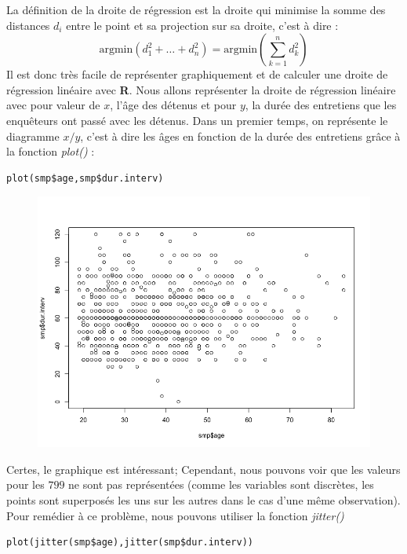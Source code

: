 La définition de la droite de régression est la droite qui minimise la somme des distances $d_{i}$ entre le point et sa projection sur sa droite, c'est à dire : 
$$\textrm{argmin} (d_{1}^{2}+ \dots + d_{n}^{2}) =  \textrm{argmin} (\sum_{k=1}^{n}d_{k}^{2})$$
Il est donc très facile de représenter graphiquement et de calculer une droite de régression linéaire avec \textbf{R}.\newline
Nous allons représenter la droite de régression linéaire avec pour valeur de $x$, l'âge des détenus et pour $y$, la durée des entretiens que les enquêteurs ont passé avec les détenus.\newline
Dans un premier temps, on représente le diagramme $x/y$, c'est à dire les âges en fonction de la durée des entretiens grâce à la fonction \textit{plot()} :
\begin{lstlisting}[language=html]
plot(smp$age,smp$dur.interv) 
\end{lstlisting}
\begin{figure}[H]\begin{center}\includegraphics[scale=0.35]{ilu/cm.png}\end{center}\end{figure}
Certes, le graphique est intéressant; Cependant, nous pouvons voir que les valeurs pour les $799$ ne sont pas représentées (comme les variables sont discrètes, les points sont superposés les uns sur les autres dans le cas d'une même observation). Pour remédier à ce problème, nous pouvons utiliser la fonction \textit{jitter()}
\begin{lstlisting}[language=html]
plot(jitter(smp$age),jitter(smp$dur.interv))
\end{lstlisting}

